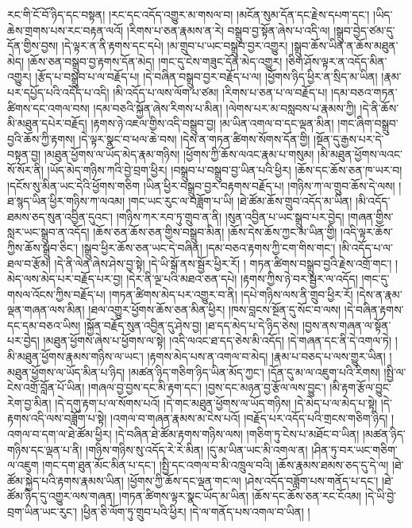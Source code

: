 རང་གི་ངོ་བོ་ཉིད་དང་བསྟན། །རང་དང་འདོད་འགྱུར་མ་གསལ་བ། །མངོན་སུམ་དོན་དང་རྗེས་དཔག་དང་། །ཡིད་ཆེས་གྲགས་པས་རང་བརྟན་ལའོ། །རིགས་པ་ཅན་རྣམས་ན་རེ། བསྒྲུབ་བྱ་སྟོན་ཞེས་པ་འདི་ལ། །སྒྲུབ་བྱེད་ཙམ་དུ་དོན་གྱིས་བྱས། །དེ་ལྟར་ན་ནི་རྟགས་དང་དཔེ། །མ་གྲུབ་པ་ཡང་བསྒྲུབ་བྱར་འགྱུར། །སྒྲུབ་ཆོས་ཡིན་ན་ཆོས་མཐུན་མེད། །ཆོས་ཅན་བསྒྲུབ་བྱ་རྟགས་དོན་མེད། །གང་དུ་ངེས་གཟུང་དོན་མེད་འགྱུར། །ཅིག་ཤོས་ལྟར་ན་འདོད་མིན་འགྱུར། །རྩོད་པ་བསྒྲུབ་པ་ལ་བརྗོད་པ། །དེ་བཞིན་བསྒྲུབ་བྱར་བརྗོད་པ་ལ། །ཕྱོགས་ཉིད་ཕྱིར་ན་སྲིད་མ་ཡིན། །རྣམ་པར་དཔྱོད་པའི་འདོད་པ་འདི། །མི་འདོད་པ་ལས་ལོག་པ་ཙམ། །རིགས་པ་ཅན་པ་ལ་བརྗོད་པ། །དམ་བཅའ་གཏན་ཚིགས་དང་འགལ་བས། །དམ་བཅའི་སྐྱོན་ཞེས་རིགས་པ་མིན། །ལེགས་པར་མ་བསླབས་པ་རྣམས་ཀྱི། །དེ་ནི་ཆོས་མི་མཐུན་དཔེར་བརྗོད། །རྟགས་ཉེ་འཇལ་གྱིས་འདི་བསྒྲུབ་བྱ། །མ་ཡིན་འགལ་བ་དང་ལྡན་མིན། །གང་ཞིག་བསྒྲུབ་བྱའི་ཆོས་ཀྱི་རྟགས། །དེ་ལྟར་སྣང་བ་ཕལ་ཆེ་བས། །དེས་ན་གཏན་ཚིགས་སོགས་དོན་གྱི། །སྔོན་དུ་རྒྱས་པར་དེ་བསྟན་བྱ། །མཐུན་ཕྱོགས་ལ་ཡོད་མེད་རྣམ་གཉིས། །ཕྱོགས་ཀྱི་ཆོས་ལའང་རྣམ་པ་གསུམ། །མི་མཐུན་ཕྱོགས་ལའང་སོ་སོར་ནི། །ཡོད་མེད་གཉིས་ཀའི་བྱེ་བྲག་ཕྱིར། །བསྒྲུབ་པ་བསྒྲུབ་བྱ་ཡིན་པའི་ཕྱིར། །ཆོས་དང་ཆོས་ཅན་ཁ་ཡར་བ། །དངོས་སུ་མིན་ཡང་དེའི་ཕྱོགས་གཅིག །ཡིན་ཕྱིར་བསྒྲུབ་བྱར་བརྟགས་བརྗོད་པ། །གཉིས་ཀ་ལ་གྲུབ་ཆོས་དེ་ལས། །ཐ་སྙད་ཡིན་ཕྱིར་གཉིས་ཀ་ལའམ། །གང་ཡང་རུང་ལ་བཟློག་པ་ཡི། །ཐེ་ཚོམ་ཆོས་གྲུབ་འདོད་མ་ཡིན། །མི་འདོད་ཐམས་ཅད་སུན་འབྱིན་དུའང་། །གཉིས་ཀར་རབ་ཏུ་གྲུབ་ན་ནི། །སུན་འབྱིན་པ་ཡང་སྒྲུབ་པར་བྱེད། །གཞན་གྱིས་སླར་ཡང་སྒྲུབ་ན་འདོད། །ཆོས་ཅན་ཆོས་ཅན་གྱིས་བསྒྲུབ་མིན། །ཆོས་དེས་ཆོས་ཀྱང་མ་ཡིན་གྱི། །འདི་ལྟར་ཆོས་ཀྱིས་ཆོས་སྒྲུབ་ཅིང་། །སྒྲུབ་ཕྱིར་ཆོས་ཅན་ཡང་དེ་བཞིན། །དམ་བཅའ་རྟགས་ཀྱི་ངག་གིས་གང་། །མི་འདོད་པ་ལ་ཐལ་བ་རྩོམ། །དེ་ནི་ལེན་ཞེས་ཤེས་བྱ་སྟེ། །དེ་ཡི་སྒོ་ནས་སྦྱོར་ཕྱིར་རོ། །
གཏན་ཚིགས་བསྒྲུབ་བྱའི་རྗེས་འགྲོ་གང་། །མེད་ལས་མེད་པར་བརྗོད་པར་བྱ། །དེར་ནི་ལྔ་པའི་མཐའ་ཅན་དཔེ། །རྟགས་ཀྱིས་ཉེ་བར་སྦྱར་ལ་འདོད། །གང་དུ་གསལ་འོངས་ཀྱིས་བརྗོད་པ། །གཏན་ཚིགས་མེད་པར་འགྱུར་བ་ནི། །དཔེ་གཉིས་ལས་ནི་གྲུབ་ཕྱིར་རོ། །དེས་ན་རྣམ་ལྡན་གཞན་ལས་མིན། །ཐལ་འགྱུར་ཕྱོགས་ཆོས་ཅན་མིན་ཕྱིར། །ཁས་བླངས་སྔོན་དུ་སོང་བ་ལས། །དེ་བཞིན་རྟགས་དང་དམ་བཅའ་ཡིས། །སྐྱོན་བརྗོད་སུན་འབྱིན་དུ་ཤེས་བྱ། །ཐ་དད་མེད་པ་དེ་ཉིད་ཅེས། །བྱས་ནས་གཞན་ལ་སྟོན་པར་བྱེད། །མཐུན་ཕྱོགས་ཞེས་པ་ཕྱོགས་ལ་སྟེ། །འདི་ལའང་ཐ་དད་ཅེས་མི་འདོད། །དེ་གཞན་དང་ནི་དེ་འགལ་ཏེ། །མི་མཐུན་ཕྱོགས་རྣམས་གཉིས་ལ་ཡང་། །རྟགས་མེད་པས་ན་འགལ་བ་མེད། །རྣམ་པ་བཅད་པ་ལས་གྱུར་ཡིན། །མཐུན་ཕྱོགས་ལ་ཡོད་མིན་པ་ཉིད། །མཚན་ཉིད་གཅིག་ཉིད་ཡིན་མོད་ཀྱང་། །དོན་དུ་མ་ལ་འཇུག་པའི་རིགས། །སྤྱི་ལ་ངེས་འགྲོ་བློན་པོ་ཡིན། །གཞལ་བྱ་བྱས་དང་མི་རྟག་དང་། །བྱས་དང་མཉན་བྱ་རྩོལ་ལས་བྱུང་། །མི་རྟག་རྩོལ་བྱུང་རེག་བྱ་མིན། །དེ་དགུ་རྟག་པ་ལ་སོགས་པའོ། །དེ་གང་མཐུན་ཕྱོགས་ལ་ཡོད་གཉིས། །དེ་མེད་པ་ལ་མེད་པ་སྟེ། །དེ་རྟགས་འདི་ལས་བཟློག་པ་སྟེ། །འགལ་བ་གཞན་རྣམས་མ་ངེས་པའོ། །བརྗོད་པར་འདོད་པའི་གྲངས་གཅིག་ཉིད། །འགལ་བ་དག་ལ་ཐེ་ཚོམ་ཕྱིར། །དེ་བཞིན་ཐེ་ཚོམ་རྟགས་གཉིས་ལས། །གཅིག་ཏུ་ངེས་པ་མཐོང་བ་ཡིན། །མཚན་ཉིད་གཉིས་དང་ལྡན་པ་ནི། །གཉིས་གཉིས་སུ་འདོད་རེ་རེ་མིན། །དུ་མ་ཡིན་ཡང་མི་འགལ་ན། །ཤིན་ཏུ་བར་ཡང་གཅིག་ལ་འཇུག །གང་དག་ཐུན་མོང་མིན་པ་དང་། །སྤྱི་དང་འགལ་བ་མི་འཁྲུལ་བའི། །ཆོས་རྣམས་ཐམས་ཅད་དུ་དེ་ལ། །ཐེ་ཚོམ་སྐྱེད་པའི་རྟགས་རྣམས་ཡིན། །ཕྱོགས་ཀྱི་ཆོས་དང་ལྡན་གང་ལ། །ཤེས་འདོད་བཟློག་པས་གནོད་པ་དང་། །ཐེ་ཚོམ་ཉིད་དུ་འགྱུར་ལས་གཞན། །གཏན་ཚིགས་ལྟར་སྣང་ཡོད་མ་ཡིན། །ཆོས་དང་ཆོས་ཅན་རང་ངོའམ། །དེ་ཡི་བྱེ་བྲག་ཡིན་ཡང་རུང་། །ཕྱིན་ཅི་ལོག་ཏུ་གྲུབ་པའི་ཕྱིར། །དེ་ལ་གནོད་པས་འགལ་བ་ཡིན། །
